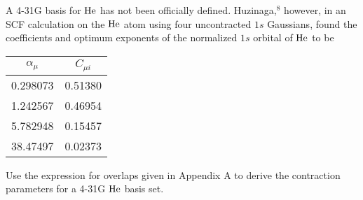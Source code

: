 \documentclass[a4paper]{book}
\newcounter{exercise}[chapter]
\begin{document}
	\begin{exercise}
	A 4-31G basis for $\ce{He}$ has not been officially defined. Huzinaga,${}^8$ however, in an SCF calculation on the $\ce{He}$ atom using four uncontracted $1s$ Gaussians, found the coefficients and optimum exponents of the normalized $1s$ orbital of $\ce{He}$ to be
	\begin{center}
	\begin{tabular}{cc} \hline
		$\alpha_\mu$ 	& $C_{\mu i}$ 	\\ \hline
		0.298073		& 0.51380		\\
		1.242567		& 0.46954 		\\
		5.782948		& 0.15457		\\
		38.47497		& 0.02373		\\ \hline
	\end{tabular}
	\end{center}
	Use the expression for overlaps given in Appendix A to derive the contraction parameters for a 4-31G $\ce{He}$ basis set.
	\end{exercise}
	
\end{document}
